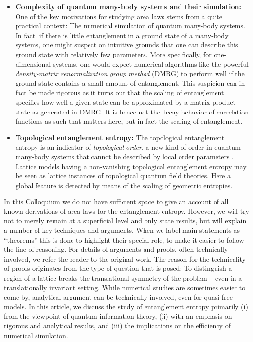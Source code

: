 \documentclass[rmp,twocolumn,floatfix,epsfig,graphics]{revtex4} %
\begin{document}
\begin{itemize}
\item {\bf Complexity of quantum many-body systems and their 
simulation:} One of the key motivations for 
studying area laws stems from a quite practical context: The 
numerical simulation of quantum many-body systems. In fact, if 
there is little entanglement in a ground state of a many-body
systems, one might suspect on intuitive grounds that one can 
describe this ground state with relatively few parameters. More 
specifically, for one-dimensional systems, 
one would expect numerical algorithms like the powerful 
{\it density-matrix renormalization group method} \cite{White,Scholl} 
(DMRG) to perform well if the ground state contains a small 
amount of entanglement. This suspicion can in fact be made 
rigorous \cite{Peschel,DMRG,OneD,SchuchApprox} as it turns out 
that the scaling of entanglement specifies how well a given state 
can be approximated by a matrix-product state \cite{FCS,Scholl} 
as generated in DMRG. It is hence not the decay behavior of 
correlation functions as such that matters here, but in fact 
the scaling of entanglement.

\item {\bf Topological entanglement entropy:} 
The topological entanglement entropy is an indicator of 
{\it topological order},\cite{OldWen,WittenOld,Ortiz} 
a new kind of order in quantum 
many-body systems that cannot be described by local order 
parameters \cite{Preskill,Wen,FradkinTopological,Haque,Ortiz}. 
Lattice models having a non-vanishing topological entanglement 
entropy may be seen as lattice instances of topological 
quantum field theories. Here a global feature is detected by means
of the scaling of geometric entropies.
\end{itemize}

In this Colloquium we do not have sufficient space to give 
an account of all known derivations of area laws for the 
entanglement entropy. However, we will try 
not to merely remain at a superficial level and only state results, 
but will explain 
a number of key techniques and arguments. When we label main 
statements as ``theorems'' this is done to highlight their 
special role, to make it easier to follow the line of reasoning.
For details of arguments 
and proofs, often technically involved, we refer the reader to the 
original work. The reason for the technicality of proofs originates 
from the type of question that is posed: To distinguish a region 
of a lattice breaks the translational symmetry of the problem -- even in a translationally invariant setting.
While numerical studies are sometimes easier to come by, analytical 
argument can be technically involved, even for quasi-free 
models. In this article, we discuss the study of entanglement 
entropy primarily (i) from the viewpoint of quantum information 
theory, (ii) with an emphasis on rigorous and analytical results, 
and (iii) the implications on the efficiency of numerical
simulation.
\end{document}
